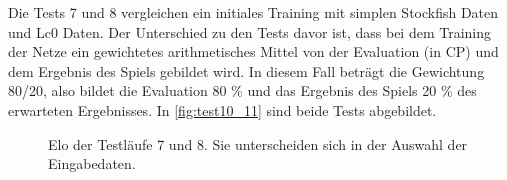 Die Tests 7 und 8 vergleichen ein initiales Training mit simplen Stockfish Daten und \ac{Lc0} Daten. Der Unterschied zu den Tests davor ist, dass bei dem Training der Netze ein gewichtetes arithmetisches Mittel von der Evaluation (in \ac{CP}) und dem Ergebnis des Spiels gebildet wird. In diesem Fall beträgt die Gewichtung 80/20, also bildet die Evaluation 80 \% und das Ergebnis des Spiels 20 \% des erwarteten Ergebnisses. In \autoref{fig:test10_11} sind beide Tests abgebildet.

\begin{figure}
  \centering
  \caption{Elo der Testläufe 7 und 8. Sie unterscheiden sich in der Auswahl der Eingabedaten.}
  \label{fig:test10_11}
\end{figure}


